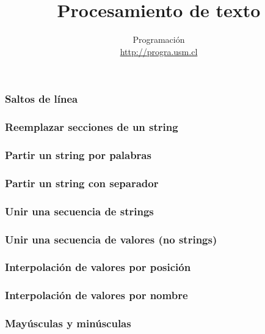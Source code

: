 \documentclass[12pt]{beamer}
\title{Procesamiento de texto}
\author{
  Programación \\ \url{http://progra.usm.cl}
}
\date{}
\begin{document}
  \begin{frame}
    \maketitle
  \end{frame}

  \begin{frame}
    \label{saltos-linea}
    \frametitle{Saltos de línea}
    
  \end{frame}

  \begin{frame}
    \label{reemplazar}
    \frametitle{Reemplazar secciones de un string}
    
  \end{frame}

  \begin{frame}
    \label{partir-string-palabras}
    \frametitle{Partir un string por palabras}
    
  \end{frame}

  \begin{frame}
    \label{partir-string-separador}
    \frametitle{Partir un string con separador}
    
  \end{frame}

  \begin{frame}
    \label{unir-strings}
    \frametitle{Unir una secuencia de strings}
    
  \end{frame}

  \begin{frame}
    \label{unir-valores}
    \frametitle{Unir una secuencia de valores (no strings)}
    
  \end{frame}

  \begin{frame}
    \label{interpolacion-posicion}
    \frametitle{Interpolación de valores por posición}
    
  \end{frame}

  \begin{frame}
    \label{interpolacion-nombre}
    \frametitle{Interpolación de valores por nombre}
    
  \end{frame}

  \begin{frame}
    \label{mayusculas-minusculas}
    \frametitle{Mayúsculas y minúsculas}
    
  \end{frame}
\end{document}
